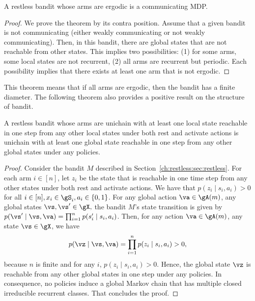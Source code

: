 \begin{thm}
    \label{thm:aperiodic_RB_comm} A restless bandit whose arms are ergodic is a communicating MDP.
\end{thm}
\begin{proof}
    We prove the theorem by its contra position. Assume that a given bandit is not communicating (either weakly communicating or not weakly communicating).
    Then, in this bandit, there are global states that are not reachable from other states.
    This implies two possibilities: (1) for some arms, some local states are not recurrent, (2) all arms are recurrent but periodic.
    Each possibility implies that there exists at least one arm that is not ergodic.
\end{proof}
This theorem means that if all arms are ergodic, then the bandit has a finite diameter.
The following theorem also provides a positive result on the structure of bandit.

\begin{thm}
    \label{thm:unichain}
    A restless bandit whose arms are unichain with at least one local state reachable in one step from any other local states under both rest and activate actions is unichain with at least one global state reachable in one step from any other global states under any policies.
\end{thm}
\begin{proof}
    Consider the bandit $M$ described in Section~\ref{ch:restless:sec:restless}.
    For each arm $i\in[n]$, let $z_i$ be the state that is reachable in one time step from any other states under both rest and activate actions.
    We have that $p(z_i \mid s_i, a_i)>0$ for all $i\in[n], x_i\in\gS_i,a_i\in\{0,1\}$.
    For any global action $\va\in\gA(m)$, any global states $\vs,\vs'\in\gX,$ the bandit $M$'s state transition is given by ${p(\vs' \mid \vs, \va) =\prod_{i=1}^n p(s'_i \mid s_i, a_i)}$.
    Then, for any action $\va\in\gA(m)$, any state $\vs\in\gX$, we have
    \begin{align*}
        p(\vz \mid \vs, \va) =\prod_{i=1}^n p(z_i \mid s_i,a_i) > 0,
    \end{align*}
    because $n$ is finite and for any $i$, $p(z_i \mid s_i, a_i)>0$.
    Hence, the global state $\vz$ is reachable from any other global states in one step under any policies.
    In consequence, no policies induce a global Markov chain that has multiple closed irreducible recurrent classes.
    That concludes the proof.
\end{proof}

